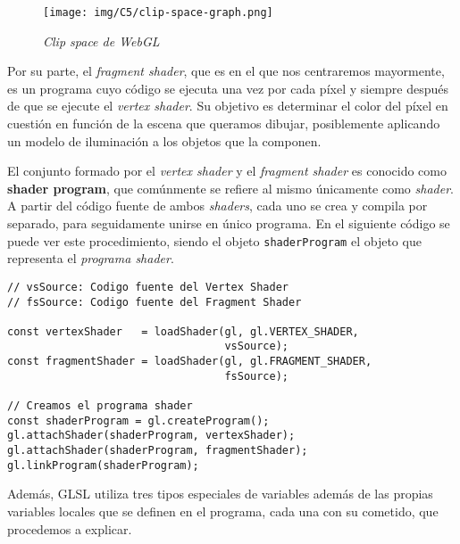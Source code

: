\begin{figure} [ht]
    \centering
    \texttt{[image: img/C5/clip-space-graph.png]}
    \caption{\textit{Clip space de WebGL}}
    \label{fig:clipspace}
\end{figure}

Por su parte, el \textit{fragment shader}, que es en el que nos centraremos mayormente, es un programa cuyo código se ejecuta una vez por cada píxel y siempre después de que se ejecute el \textit{vertex shader}. Su objetivo es determinar el color del píxel en cuestión en función de la escena que queramos dibujar, posiblemente aplicando un modelo de iluminación a los objetos que la componen.

El conjunto formado por el \textit{vertex shader} y el \textit{fragment shader} es conocido como \textbf{shader program}, que comúnmente se refiere al mismo únicamente como \textit{shader}. A partir del código fuente de ambos \textit{shaders}, cada uno se crea y compila por separado, para seguidamente unirse en único programa. En el siguiente código se puede ver este procedimiento, siendo el objeto \verb|shaderProgram| el objeto que representa el \textit{programa shader}.

\begin{lstlisting}
// vsSource: Codigo fuente del Vertex Shader
// fsSource: Codigo fuente del Fragment Shader

const vertexShader   = loadShader(gl, gl.VERTEX_SHADER, 
                                  vsSource);
const fragmentShader = loadShader(gl, gl.FRAGMENT_SHADER, 
                                  fsSource);
  
// Creamos el programa shader
const shaderProgram = gl.createProgram();
gl.attachShader(shaderProgram, vertexShader);
gl.attachShader(shaderProgram, fragmentShader);
gl.linkProgram(shaderProgram);
\end{lstlisting}

Además, GLSL utiliza tres tipos especiales de variables además de las propias variables locales que se definen en el programa, cada una con su cometido, que procedemos a explicar.


